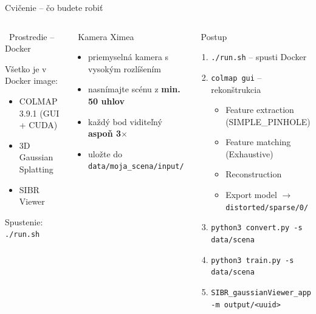 \documentclass[aspectratio=169]{beamer}
\begin{document}
\begin{frame}{Cvičenie – čo budete robiť}

\begin{columns}[t]

\begin{block}{\faDocker\ Prostredie – Docker}
{\small Všetko je v Docker image:
\begin{itemize}\setlength{\itemsep}{1pt}
    \item COLMAP 3.9.1 (GUI + CUDA)
    \item 3D Gaussian Splatting
    \item SIBR Viewer
\end{itemize}
Spustenie: \texttt{./run.sh}}
\end{block}

\vspace{0.1cm}
\begin{block}{\faCamera\ Kamera Ximea}
{\small
\begin{itemize}\setlength{\itemsep}{1pt}
    \item priemyselná kamera s vysokým rozlíšením
    \item nasnímajte scénu z \textbf{min. 50 uhlov}
    \item každý bod viditeľný \textbf{aspoň 3$\times$}
    \item uložte do \texttt{data/moja\_scena/input/}
\end{itemize}}
\end{block}


\begin{block}{\faListOl\ Postup}
{\footnotesize
\begin{enumerate}\setlength{\itemsep}{0pt}
    \item \texttt{./run.sh} – spusti Docker
    \item \texttt{colmap gui} – rekonštrukcia
    \begin{itemize}\setlength{\itemsep}{0pt}
        \item Feature extraction (SIMPLE\_PINHOLE)
        \item Feature matching (Exhaustive)
        \item Reconstruction
        \item Export model $\to$ \texttt{distorted/sparse/0/}
    \end{itemize}
    \item \texttt{python3 convert.py -s data/scena}
    \item \texttt{python3 train.py -s data/scena}
    \item \texttt{SIBR\_gaussianViewer\_app -m output/<uuid>}
\end{enumerate}}
\end{block}


\end{columns}
\end{frame}
\end{document}

